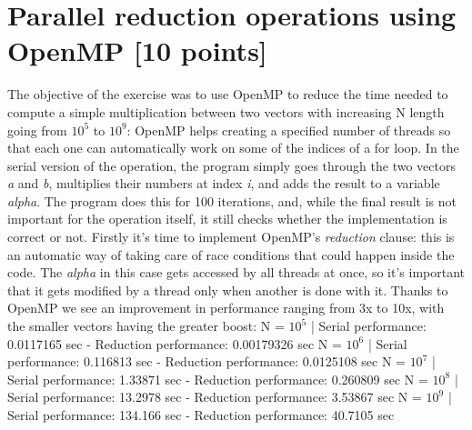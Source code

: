 \documentclass[unicode,11pt,a4paper,oneside,numbers=endperiod,openany]{scrartcl}
\begin{document}
\setassignment
{}


\section{Parallel reduction operations using OpenMP [10 points]}
The objective of the exercise was to use OpenMP to reduce the time needed to compute a simple multiplication between two vectors with increasing N length going from $10^{5}$ to $10^{9}$: OpenMP helps creating a specified number of threads so that each one can automatically work on some of the indices of a for loop.
\newline
In the serial version of the operation, the program simply goes through the two vectors \textit{a} and \textit{b}, multiplies their numbers at index \textit{i}, and adds the result to a variable \textit{alpha}.
\newline
The program does this for 100 iterations, and, while the final result is not important for the operation itself, it still checks whether the implementation is correct or not.
\newline
Firstly it's time to implement OpenMP's \textit{reduction} clause: this is an automatic way of taking care of race conditions that could happen inside the code. The \textit{alpha} in this case gets accessed by all threads at once, so it's important that it gets modified by a thread only when another is done with it.
\newline
\newline
Thanks to OpenMP we see an improvement in performance ranging from 3x to 10x, with the smaller vectors having the greater boost:
\newline
\newline
N = $10^{5}$ | Serial performance: 0.0117165 sec - Reduction performance: 0.00179326 sec
\newline
N = $10^{6}$ | Serial performance: 0.116813 sec - Reduction performance: 0.0125108 sec
\newline
N = $10^{7}$ | Serial performance: 1.33871 sec - Reduction performance: 0.260809 sec
\newline
N = $10^{8}$ | Serial performance: 13.2978 sec - Reduction performance: 3.53867 sec
\newline
N = $10^{9}$  | Serial performance: 134.166 sec - Reduction performance: 40.7105 sec
\end{document}
